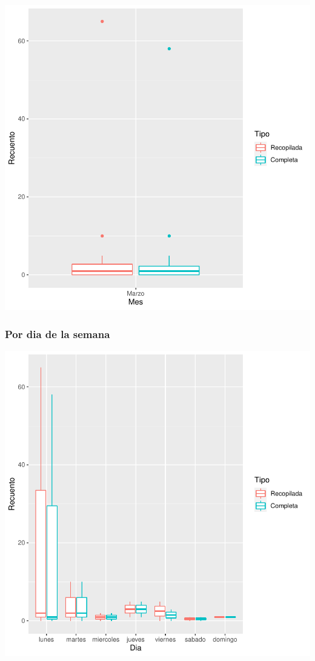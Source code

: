 \documentclass{article}
\begin{document}
\includegraphics{seguimento2-062}

\subsubsection{Por dia de la semana}

\includegraphics{seguimento2-063}
\end{document}
